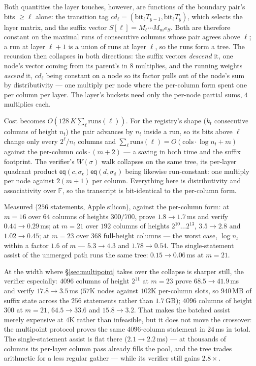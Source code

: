 \documentclass[11pt]{article}
\newcommand{\F}{\mathbb{F}}
\newcommand{\eq}{\mathsf{eq}}
\begin{document}
Both quantities the layer touches, however, are functions of the
boundary pair's bits $\ge \ell$ alone: the transition tag
$cd_\ell = (\mathrm{bit}_\ell T_{y-1}, \mathrm{bit}_\ell T_y)$, which
selects the layer matrix, and the suffix vector
$S[\ell] = M_\ell \cdots M_m e_S$. Both are therefore constant on the
maximal runs of consecutive columns whose pair agrees above $\ell$; a
run at layer $\ell{+}1$ is a union of runs at layer $\ell$, so the runs
form a tree. The recursion then collapses in both directions: the
suffix vectors \emph{descend} it, one node's vector coming from its
parent's in $8$ multiplies, and the running weights \emph{ascend} it,
$cd_\ell$ being constant on a node so its factor pulls out of the
node's sum by distributivity --- one multiply per node where the
per-column form spent one per column per layer. The layer's buckets
need only the per-node partial sums, $4$ multiplies each.

Cost becomes $O(128\,K \sum_\ell \mathrm{runs}(\ell))$. For the
registry's shape ($k_t$ consecutive columns of height $n_t$) the pair
advances by $n_t$ inside a run, so its bits above $\ell$ change only
every $2^\ell/n_t$ columns and
$\sum_\ell \mathrm{runs}(\ell) = O(\mathrm{cols} \cdot \log n_t + m)$
against the per-column $\mathrm{cols}\cdot(m{+}2)$ --- a saving in both
time and the suffix footprint. The verifier's $W(\sigma)$ walk collapses
on the same tree, its per-layer quadrant product
$\eq(c,\sigma_{\mathrm c})\eq(d,\sigma_{\mathrm d})$ being likewise
run-constant: one multiply per node against $2(m{+}1)$ per column.
Everything here is distributivity and associativity over $\F$, so the
transcript is bit-identical to the per-column form.

Measured ($256$ statements, Apple silicon), against the per-column
form: at $m = 16$ over $64$ columns of heights $300/700$, prove
$1.8 \to 1.7$\,ms and verify $0.44 \to 0.29$\,ms; at $m = 21$ over
$192$ columns of heights $2^{10}\!\ldots\!2^{13}$, $3.5 \to 2.8$ and
$1.02 \to 0.45$; at $m = 23$ over $368$ full-height columns --- the
worst case, $\log n_t$ within a factor $1.6$ of $m$ --- $5.3 \to 4.3$
and $1.78 \to 0.54$. The single-statement assist of the unmerged path
runs the same tree: $0.15 \to 0.06$\,ms at $m = 21$.

At the width where \S\ref{sec:multipoint} takes over the collapse is
sharper still, the verifier especially: $4096$ columns of height
$2^{11}$ at $m = 23$ prove $68.5 \to 41.9$\,ms and verify
$17.8 \to 3.5$\,ms ($57$K nodes against $102$K per-column slots, so
$940$\,MB of suffix state across the $256$ statements rather than
$1.7$\,GB); $4096$ columns of height $300$ at $m = 21$, $64.5 \to 33.6$
and $15.8 \to 3.2$. That makes the batched assist merely expensive at
$4$K rather than infeasible, but it does not move the crossover: the
multipoint protocol proves the same $4096$-column statement in
$24$\,ms in total. The single-statement assist is flat there
($2.1 \to 2.2$\,ms) --- at thousands of columns its per-layer column
pass already fills the pool, and the tree trades arithmetic for a less
regular gather --- while its verifier still gains $2.8\times$.
\end{document}

